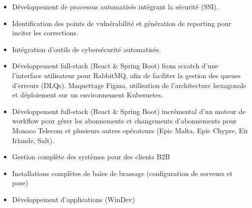 \documentclass[10pt,a4paper,ragged2e,withhyper]{altacv}
\begin{document}

\makecvheader


\begin{paracol}{2}


\begin{itemize}
    \item Développement de processus automatisés intégrant la sécurité (SSI). 
    \item Identification des points de vulnérabilité et génération de reporting pour inciter les corrections.
    \item Intégration d’outils de cybersécurité automatisés.
\end{itemize}

\divider

\begin{itemize}
    \item Développement full-stack (React \& Spring Boot) from scratch d'une l'interface utilisateur pour RabbitMQ, afin de faciliter la gestion des queues d'erreurs (DLQs). Maquettage Figma, utilisation de l'architecture hexagonale et déploiement sur un environnement Kubernetes.
    \item Développement full-stack (React \& Spring Boot) incrémental d'un moteur de workflow pour gérer les abonnements et changements d’abonnements pour Monaco Telecom et plusieurs autres opérateurs (Epic Malta, Epic Chypre, Eir Irlande, Salt).
\end{itemize}

\divider

\begin{itemize}
    \item Gestion complète des systèmes pour des clients B2B
    \item Installations complètes de baies de brassage (configuration de serveurs et pose)
    \item Développement d'applications (WinDev)
\end{itemize}


\end{paracol}
\end{document}

